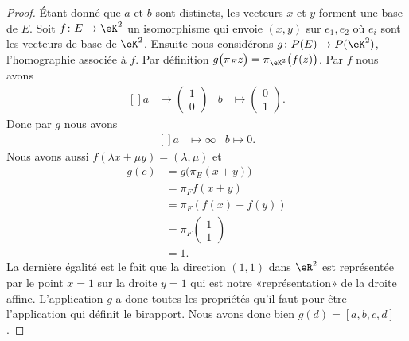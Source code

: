 \begin{proof}
	Étant donné que \( a\) et \( b\) sont distincts, les vecteurs \( x\) et \( y\) forment une base de \( E\). Soit \( f\colon E\to \eK^2\) un isomorphisme qui envoie \( (x,y)\) sur \( e_1,e_2\) où \( e_i\) sont les vecteurs de base de \( \eK^2\). Ensuite nous considérons  \( g\colon P(E)\to P(\eK^2)\), l'homographie associée à \( f\). Par définition \( g\big( \pi_Ez \big)=\pi_{\eK^2}\big( f(z) \big)\). Par \( f\) nous avons
	\begin{equation}
		\begin{aligned}[]
			a & \mapsto \begin{pmatrix}
				            1 \\
				            0
			            \end{pmatrix}
			  & b                       & \mapsto\begin{pmatrix}
				                                     0 \\
				                                     1
			                                     \end{pmatrix}.
		\end{aligned}
	\end{equation}
	Donc par \( g\) nous avons
	\begin{equation}
		\begin{aligned}[]
			a & \mapsto\infty &
			b\mapsto 0.
		\end{aligned}
	\end{equation}
	Nous avons aussi \( f(\lambda x+\mu y)=(\lambda,\mu)\) et
	\begin{subequations}
		\begin{align}
			g(c) & =g\big( \pi_E(x+y) \big) \\
			     & =\pi_Ff(x+y)             \\
			     & =\pi_F(f(x)+f(y))        \\
			     & =\pi_F\begin{pmatrix}
				             1 \\
				             1
			             \end{pmatrix}     \\
			     & =1.
		\end{align}
	\end{subequations}
	La dernière égalité est le fait que la direction \( (1,1)\) dans \( \eR^2\) est représentée par le point \( x=1\) sur la droite \( y=1\) qui est notre «représentation» de la droite affine. L'application \( g\) a donc toutes les propriétés qu'il faut pour être l'application qui définit le birapport. Nous avons donc bien \( g(d)=[a,b,c,d]\).


\end{proof}
